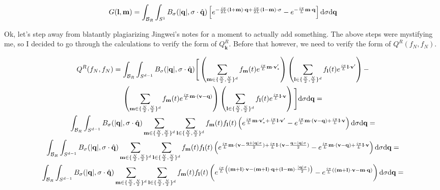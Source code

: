 \documentclass{article}
\def\t{\text}
\def\b{\mathbf}
\begin{document}
\begin{equation} \label{eq:Glm}
    G(\b l, \b m) = \int_{\mathcal{B}_R} \int_{S^{1}} B_{\sigma}(|\b q|, \sigma \cdot \hat{\b q}) \left[ e^{-\frac{i \pi}{2L} \b (\b l + \b m) \cdot \b q + \frac{i \pi}{2L} \b (\b l - \b m) \cdot \b \sigma} - e^{-\frac{i \pi}{L} \b m \cdot \b q } \right] \t d \sigma \t d \b q
\end{equation}

Ok, let's step away from blatantly plagiarizing Jingwei's notes for a moment to actually add something. The above steps were mystifying me, so I decided to go through the calculations to verify the form of $Q^R_{\b k}$. Before that however, we need to verify the form of $Q^R(f_N,f_N)$.

\begin{gather*}
    Q^R(f_N,f_N) = \int_{\mathcal{B}_R} \int_{S^{d-1}} B_{\sigma}(|\b q|, \sigma \cdot \hat{\b q}) \Bigg[ \left(\sum_{\b m \in \{\frac{N}{2}, \frac{N}{2} \}^d} f_{\b m}(t) e^{\frac{i \pi}{L} \b m \cdot \b v'_*} \right) \left(\sum_{\b l \in \{\frac{N}{2}, \frac{N}{2} \}^d} f_{\b l}(t) e^{\frac{i \pi}{L} \b l \cdot \b v'} \right) - \\
    \left(\sum_{\b m \in \{\frac{N}{2}, \frac{N}{2} \}^d} f_{\b m}(t) e^{\frac{i \pi}{L} \b m \cdot (\b v - \b q)} \right) \left(\sum_{\b l \in \{\frac{N}{2}, \frac{N}{2} \}^d} f_{\b l}(t) e^{\frac{i \pi}{L} \b l \cdot \b v} \right) \Bigg] \t d \sigma \t d \b q = \\
    \int_{\mathcal{B}_R} \int_{S^{d-1}} B_{\sigma}(|\b q|, \sigma \cdot \hat{\b q}) \sum_{\b m \in \{\frac{N}{2}, \frac{N}{2} \}^d} \sum_{\b l \in \{\frac{N}{2}, \frac{N}{2} \}^d} f_{\b m}(t) f_{\b l}(t) \left( e^{\frac{i \pi}{L} \b m \cdot \b v'_* + \frac{i \pi}{L} \b l \cdot \b v'}  - e^{\frac{i \pi}{L} \b m \cdot (\b v - \b q) + \frac{i \pi}{L} \b l \cdot \b v} \right) \t d \sigma \t d \b q = \\
    \int_{\mathcal{B}_R} \int_{S^{d-1}} B_{\sigma}(|\b q|, \sigma \cdot \hat{\b q}) \sum_{\b m \in \{\frac{N}{2}, \frac{N}{2} \}^d} \sum_{\b l \in \{\frac{N}{2}, \frac{N}{2} \}^d} f_{\b m}(t) f_{\b l}(t) \left( e^{\frac{i \pi}{L} \b m \cdot (\b v - \frac{\b q + |\b q| \sigma}{2}) + \frac{i \pi}{L} \b l \cdot \b (\b v - \frac{\b q - |\b q| \sigma}{2})}  - e^{\frac{i \pi}{L} \b m \cdot (\b v - \b q) + \frac{i \pi}{L} \b l \cdot \b v} \right) \t d \sigma \t d \b q = \\ 
    \int_{\mathcal{B}_R} \int_{S^{d-1}} B_{\sigma}(|\b q|, \sigma \cdot \hat{\b q}) \sum_{\b m \in \{\frac{N}{2}, \frac{N}{2} \}^d} \sum_{\b l \in \{\frac{N}{2}, \frac{N}{2} \}^d} f_{\b m}(t) f_{\b l}(t) \left( e^{\frac{i \pi}{L} \left( (\b m + \b l) \cdot \b v - (\b m + \b l) \cdot \b q + (\b l - \b m) \cdot \frac{|\b q| \sigma}{2} ) \right)}  - e^{\frac{i \pi}{L} \left( (\b m + \b l) \cdot \b v - \b m \cdot \b q \right)} \right) \t d \sigma \t d \b q = \\ 

\end{gather*}
\end{document}
